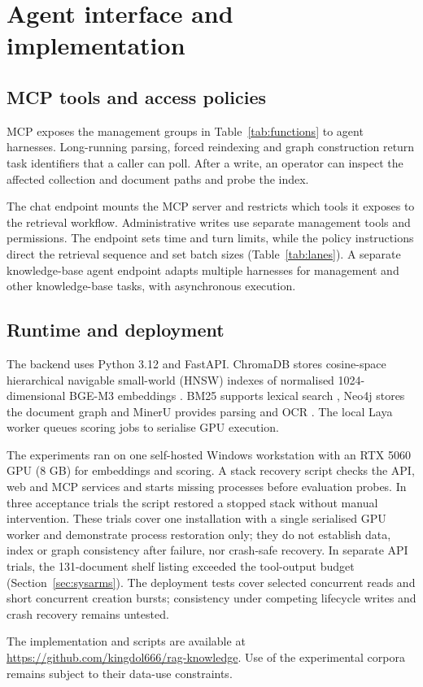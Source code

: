 \section{Agent interface and implementation}
\label{sec:implementation}
\label{sec:impl}

\subsection{MCP tools and access policies}
\label{sec:impl-tools}

MCP exposes the management groups in Table~\ref{tab:functions} to agent
harnesses. Long-running parsing, forced reindexing and graph construction
return task identifiers that a caller can poll. After a write, an operator
can inspect the affected collection and document paths and probe the index.

 The chat endpoint mounts the MCP server and restricts which tools it
exposes to the retrieval workflow. Administrative writes use separate
management tools and permissions. The endpoint sets time and turn limits, while the
policy instructions direct the retrieval sequence and set batch sizes (Table~\ref{tab:lanes}).
A separate knowledge-base agent endpoint adapts multiple harnesses for management and
other knowledge-base tasks, with asynchronous execution.

\subsection{Runtime and deployment}
\label{sec:impl-runtime}

The backend uses Python 3.12 and FastAPI. ChromaDB stores cosine-space
hierarchical navigable small-world (HNSW)
indexes of normalised 1024-dimensional BGE-M3 embeddings
\cite{chroma,hnsw,bge-m3}. BM25 supports lexical search \cite{bm25}, Neo4j
stores the document graph \cite{neo4j} and MinerU provides parsing and OCR
\cite{mineru}. The local Laya worker queues scoring jobs to serialise GPU
execution.

The experiments ran on one self-hosted Windows workstation with an RTX
5060 GPU (8 GB) for embeddings and scoring. A stack recovery script checks
the API, web and MCP services and starts missing processes before evaluation
probes. In three acceptance trials the script restored a stopped stack
without manual intervention. These trials cover one installation with a
single serialised GPU worker and demonstrate process restoration only; they
do not establish data, index or graph consistency after failure, nor
crash-safe recovery. In separate API trials, the 131-document shelf listing
exceeded the tool-output budget (Section~\ref{sec:sysarms}). The deployment
tests cover selected concurrent reads and short concurrent creation bursts;
consistency under competing lifecycle writes and crash recovery remains
untested.

The implementation and scripts are available at
\url{https://github.com/kingdol666/rag-knowledge}. Use of the experimental
corpora remains subject to their data-use constraints.
